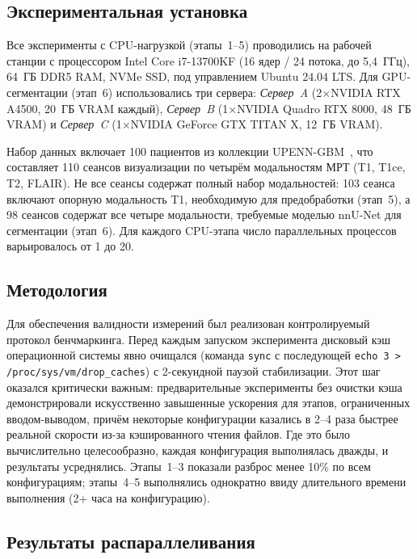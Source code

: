 \documentclass[conference]{IEEEtran}
\begin{document}
\subsection{Экспериментальная установка}

Все эксперименты с CPU-нагрузкой (этапы~1--5) проводились на рабочей станции с процессором Intel Core i7-13700KF (16 ядер / 24 потока, до 5,4~ГГц), 64~ГБ DDR5 RAM, NVMe SSD, под управлением Ubuntu 24.04 LTS. Для GPU-сегментации (этап~6) использовались три сервера: \textit{Сервер~A} (2$\times$NVIDIA RTX A4500, 20~ГБ VRAM каждый), \textit{Сервер~B} (1$\times$NVIDIA Quadro RTX 8000, 48~ГБ VRAM) и \textit{Сервер~C} (1$\times$NVIDIA GeForce GTX TITAN X, 12~ГБ VRAM).

Набор данных включает 100 пациентов из коллекции UPENN-GBM~\cite{bakas2022}, что составляет 110 сеансов визуализации по четырём модальностям МРТ (T1, T1ce, T2, FLAIR). Не все сеансы содержат полный набор модальностей: 103 сеанса включают опорную модальность T1, необходимую для предобработки (этап~5), а 98 сеансов содержат все четыре модальности, требуемые моделью nnU-Net для сегментации (этап~6). Для каждого CPU-этапа число параллельных процессов варьировалось от 1 до 20.

\subsection{Методология}

Для обеспечения валидности измерений был реализован контролируемый протокол бенчмаркинга. Перед каждым запуском эксперимента дисковый кэш операционной системы явно очищался (команда \texttt{sync} с последующей \texttt{echo 3 > /proc/sys/vm/drop\_caches}) с 2-секундной паузой стабилизации. Этот шаг оказался критически важным: предварительные эксперименты без очистки кэша демонстрировали искусственно завышенные ускорения для этапов, ограниченных вводом-выводом, причём некоторые конфигурации казались в 2--4 раза быстрее реальной скорости из-за кэшированного чтения файлов. Где это было вычислительно целесообразно, каждая конфигурация выполнялась дважды, и результаты усреднялись. Этапы~1--3 показали разброс менее 10\% по всем конфигурациям; этапы~4--5 выполнялись однократно ввиду длительного времени выполнения (2+ часа на конфигурацию).

\subsection{Результаты распараллеливания}
\end{document}

